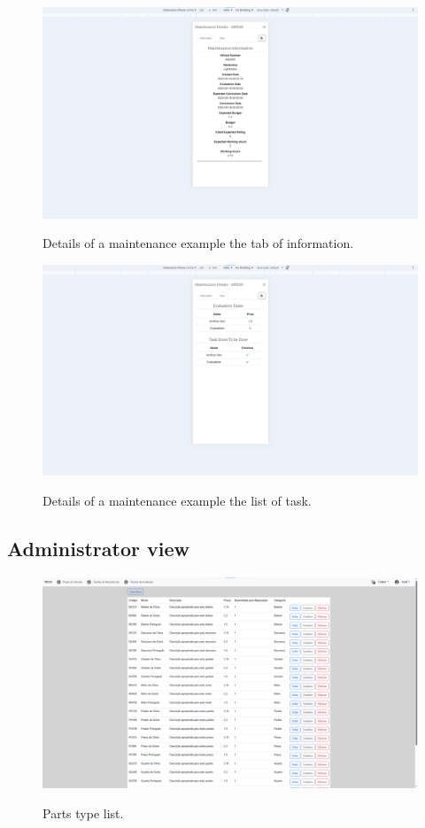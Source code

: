 \begin{figure}[h]
  \caption{Details of a maintenance example the tab of information.}
  \centering
  \includegraphics[width=\textwidth]{figs/Implementation/client/MaintenanceDetailsInfo}
  \label{fig:figure2}
\end{figure}


\begin{figure}[h]
  \caption{Details of a maintenance example the list of task.}
  \centering
  \includegraphics[width=\textwidth]{figs/Implementation/client/MaintenanceDetailsTasks}
  \label{fig:figure2}
\end{figure}


\subsection{Administrator view}


\begin{figure}[h]
  \caption{Parts type list.}
  \centering
  \includegraphics[width=\textwidth]{figs/Implementation/dealershipAdmin/partsIndex}
  \label{fig:figure2}
\end{figure}


